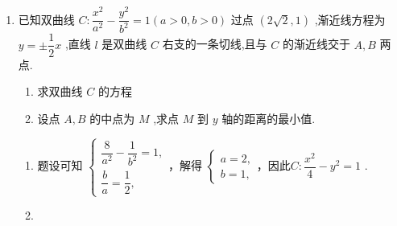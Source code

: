 \begin{enumerate}
\begin{jieda}
\begin{enumerate}
            $\left| {CD}\right|  = \sqrt{\left( {1 + 1}\right) \left\lbrack  {{\left( {x}_{3} + {x}_{4}\right) }^{2} - 4{x}_{3}{x}_{4}}\right\rbrack  } = \sqrt{2\left\lbrack  {{\left( \dfrac{4}{3}\right) }^{2} - 4 \times  \left( {-\dfrac{16}{3}}\right) }\right\rbrack  } = \dfrac{4\sqrt{26}}{3} $ .
            因为 $\left| {EB}\right|  = \left| {EA}\right|  = \sqrt{{\left( \dfrac{2}{3}\right) }^{2} + {\left( -\dfrac{1}{3} - 3\right) }^{2}} = \dfrac{2\sqrt{26}}{3} = \dfrac{1}{2}\left| {CD}\right|$ ,所以 $ A,B,C,D $ 四点在同一个圆上,此圆的圆心为点 $ E $ ,半径为 $ \dfrac{2\sqrt{26}}{3} $ ,其方程为
            $ {\left( x - \dfrac{2}{3}\right) }^{2} + {\left( y + \dfrac{1}{3}\right) }^{2} = \dfrac{104}{9}. $
        \end{enumerate}
    \end{jieda}
    \item 已知双曲线 $C : \dfrac{{x}^{2}}{{a}^{2}} - \dfrac{{y}^{2}}{{b}^{2}} = 1\left( {a > 0,b > 0}\right)$ 过点 $\left( {2\sqrt{2},1}\right)$ ,渐近线方程为 $y =  \pm  \dfrac{1}{2}x$ ,直线 $l$ 是双曲线 $C$ 右支的一条切线,且与 $C$ 的渐近线交于 $A,B$ 两点.
    \begin{enumerate}
        \item 求双曲线 $C$ 的方程
        \item 设点 $A,B$ 的中点为 $M$ ,求点 $M$ 到 $y$ 轴的距离的最小值.
    \end{enumerate}
    \begin{jieda}
        \begin{enumerate}
            \item 题设可知 $\left\{  \begin{array}{l} \dfrac{8}{{a}^{2}} - \dfrac{1}{{b}^{2}} = 1, \\  \dfrac{b}{a} = \dfrac{1}{2}, \end{array}\right.$，解得 $\left\{  \begin{array}{l} a = 2, \\  b = 1, \end{array}\right.$，因此$C : \dfrac{{x}^{2}}{4} - {y}^{2} = 1$ .
            \item 
\end{enumerate}
\end{jieda}
\end{enumerate}
